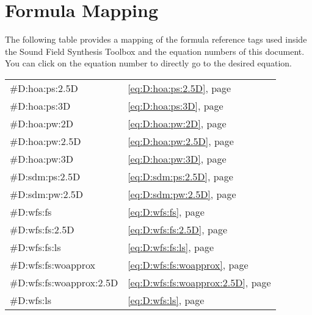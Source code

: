 \def \GITHUB {\GITHUBBASE/03_formula}

\chapter{Formula Mapping}
\label{cha:formula}
%
The following table provides a mapping of the formula reference tags used
inside the Sound Field Synthesis Toolbox and the equation numbers of this
document. You can click on the equation number to directly go to the desired
equation.

\begin{longtable}{ll}
    \#D:hoa:ps:2.5D           & \eqref{eq:D:hoa:ps:2.5D},             page \pageref{eq:D:hoa:ps:2.5D} \\
    \#D:hoa:ps:3D             & \eqref{eq:D:hoa:ps:3D},               page \pageref{eq:D:hoa:ps:3D} \\
    \#D:hoa:pw:2D             & \eqref{eq:D:hoa:pw:2D},               page \pageref{eq:D:hoa:pw:2D} \\
    \#D:hoa:pw:2.5D           & \eqref{eq:D:hoa:pw:2.5D},             page \pageref{eq:D:hoa:pw:2.5D} \\
    \#D:hoa:pw:3D             & \eqref{eq:D:hoa:pw:3D},               page \pageref{eq:D:hoa:pw:3D} \\
    \#D:sdm:ps:2.5D           & \eqref{eq:D:sdm:ps:2.5D},             page \pageref{eq:D:sdm:ps:2.5D} \\
    \#D:sdm:pw:2.5D           & \eqref{eq:D:sdm:pw:2.5D},             page \pageref{eq:D:sdm:pw:2.5D} \\
    \#D:wfs:fs                & \eqref{eq:D:wfs:fs},                  page \pageref{eq:D:wfs:fs} \\
    \#D:wfs:fs:2.5D           & \eqref{eq:D:wfs:fs:2.5D},             page \pageref{eq:D:wfs:fs:2.5D} \\
    \#D:wfs:fs:ls             & \eqref{eq:D:wfs:fs:ls},               page \pageref{eq:D:wfs:fs:ls} \\
    \#D:wfs:fs:woapprox       & \eqref{eq:D:wfs:fs:woapprox},         page \pageref{eq:D:wfs:fs:woapprox} \\
    \#D:wfs:fs:woapprox:2.5D  & \eqref{eq:D:wfs:fs:woapprox:2.5D},    page \pageref{eq:D:wfs:fs:woapprox:2.5D} \\
    \#D:wfs:ls                & \eqref{eq:D:wfs:ls},                  page \pageref{eq:D:wfs:ls} \\

\end{longtable}
